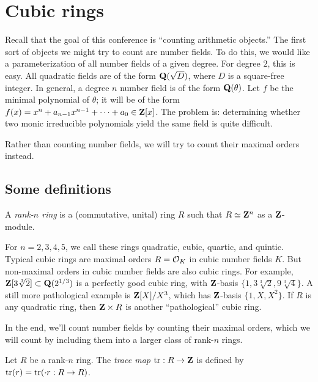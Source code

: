 
\section{Cubic rings}\label{sec:wood-i}





Recall that the goal of this conference is ``counting arithmetic 
objects.'' The first sort of objects we might try to count are number fields. 
To do this, we would like a parameterization of all number fields of a given 
degree. For degree $2$, this is easy. All quadratic fields are of the form 
$\mathbf{Q}(\sqrt D)$, where $D$ is a square-free integer. 
In general, a degree $n$ number field is of the form $\mathbf{Q}(\theta)$. Let $f$ 
be the minimal polynomial of $\theta$; it will be of the form 
$f(x)=x^n+a_{n-1} x^{n-1} + \cdots + a_0\in \mathbf{Z}[x]$. The problem is: determining 
whether two monic irreducible polynomials yield the same field is quite 
difficult. 

Rather than counting number fields, we will try to count their maximal orders 
instead. 





\subsection{Some definitions}

\begin{defi}
A \emph{rank-$n$ ring} is a (commutative, unital) ring $R$ such that 
$R\simeq \mathbf{Z}^n$ as a $\mathbf{Z}$-module. 
\end{defi}

For $n=2,3,4,5$, we call these rings quadratic, cubic, quartic, and quintic. 
Typical cubic rings are maximal orders $R=\mathcal{O}_K$ in cubic number fields $K$. 
But non-maximal orders in cubic number fields are also cubic rings. For 
example, $\mathbf{Z}[3\sqrt[3] 2]\subset \mathbf{Q}(2^{1/3})$ is a perfectly good cubic 
ring, with $\mathbf{Z}$-basis $\{1,3\sqrt[3] 2,9\sqrt[3] 4\}$. A still more 
pathological example is $\mathbf{Z}[X]/X^3$, which has $\mathbf{Z}$-basis $\{1,X,X^2\}$. If 
$R$ is any quadratic ring, then $\mathbf{Z}\times R$ is another ``pathological'' cubic 
ring. 

In the end, we'll count number fields by counting their maximal orders, which 
we will count by including them into a larger class of rank-$n$ rings. 

\begin{defi}
Let $R$ be a rank-$n$ ring. The \emph{trace map} $\operatorname{tr}:R\to\mathbf{Z}$ is 
defined by $\operatorname{tr}(r) = \operatorname{tr}(\cdot r:R\to R)$. 
\end{defi}

